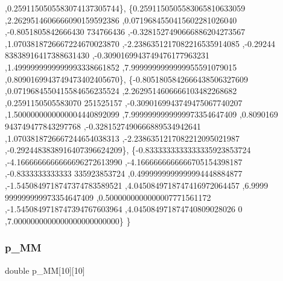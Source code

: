 \begin{DoxyCode}
       ,0.2591150505583074137305744\},
\{0.2591150505583065810633059 ,2.2629514606666090159592386 ,0.0719684550415602281026040 ,-0.8051805842666430
      734766436 ,-0.3281527490666886204273567 ,1.0703818726667224670023870 ,-2.2386351217082216535914085 ,-0.29244
      83838916417388631430 ,-0.3090169943749476177963231 ,1.4999999999999993338661852 ,7.9999999999999955591079015
       ,0.8090169943749473402405670\},
\{-0.8051805842666438506327609 ,0.0719684550415584656235524 ,2.2629514606666103482268682 ,0.2591150505583070
      251525157 ,-0.3090169943749475067740207 ,1.5000000000000004440892099 ,7.9999999999999973354647409 ,0.8090169
      943749477843297768 ,-0.3281527490666889534942641 ,1.0703818726667244654038313 ,-2.2386351217082212095021987 
      ,-0.2924483838916407396624209\},
\{-0.8333333333333335923853724 ,-4.1666666666666696272613990 ,-4.1666666666666705154398187 ,-0.8333333333333
      335923853724 ,0.4999999999999994448884877 ,-1.5450849718747374783589521 ,4.0450849718747416972064457 ,6.9999
      999999999973354647409 ,0.5000000000000007771561172 ,-1.5450849718747394767603964 ,4.045084971874740809028026
      0 ,7.0000000000000000000000000\}
\}
\end{DoxyCode}
\mbox{\label{a00452_ad71c0df2aec984429caaee5dd3ebfc9b}} 
\subsubsection{\texorpdfstring{p\+\_\+\+MM}{p\_MM}}
{\footnotesize\ttfamily double p\+\_\+\+MM\mbox{[}10\mbox{]}\mbox{[}10\mbox{]}}

